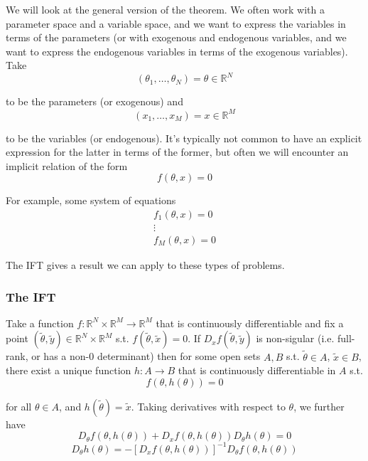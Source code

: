 \documentclass{article}
\begin{document}
We will look at the general version of the theorem. We often work with a parameter space and a variable space, and we  want to express the variables in terms of the parameters (or with exogenous and endogenous variables, and we want to express the endogenous variables in terms of the exogenous variables). Take
\[
  (\theta_1, \ldots, \theta_N) = \theta \in \mathbb{R}^N
\]

to be the parameters (or exogenous) and
\[
  (x_1, \ldots, x_M) = x \in \mathbb{R}^M
\]

to be the variables (or endogenous). It's typically not common to have an explicit expression for the latter in terms of the former, but often we will encounter an implicit relation of the form
\[
  f(\theta, x) = 0
\]

For example, some system of equations
\begin{equation}
  \begin{array}{c}
    f_1(\theta, x) = 0 \\
    \vdots \\
    f_M(\theta, x) = 0
  \end{array}
  \nonumber
\end{equation}

The IFT gives a result we can apply to these types of problems.

\subsubsection{The IFT}
\label{ssub:the_ift}

\begin{theorem}
  Take a function $f: \mathbb{R}^N \times \mathbb{R}^M \to \mathbb{R}^M$ that is continuously differentiable and fix a point $(\widetilde{\theta}, \widetilde{y}) \in \mathbb{R}^N \times \mathbb{R}^M$ s.t. $f(\widetilde{\theta}, \widetilde{x}) = 0$. If $D_x f(\widetilde{\theta}, \widetilde{y})$ is non-sigular (i.e. full-rank, or has a non-0 determinant) then for some open sets $A, B$ s.t. $\widetilde{\theta} \in A$, $\widetilde{x} \in B$, there exist a unique function $h: A \to B$ that is continuously differentiable in $A$ s.t.
  \[
    f(\theta, h(\theta)) = 0
  \]

  for all $\theta \in A$, and $h(\widetilde{\theta}) = \widetilde{x}$. Taking derivatives with respect to $\theta$, we further have
  \[
    D_\theta f(\theta, h(\theta)) + D_x f(\theta, h(\theta)) D_\theta h(\theta) = 0
  \]
  \[
    D_\theta h(\theta) = - \left[D_x f(\theta, h(\theta))\right]^{-1} D_\theta f(\theta, h(\theta))
  \]
\end{theorem}
\end{document}
